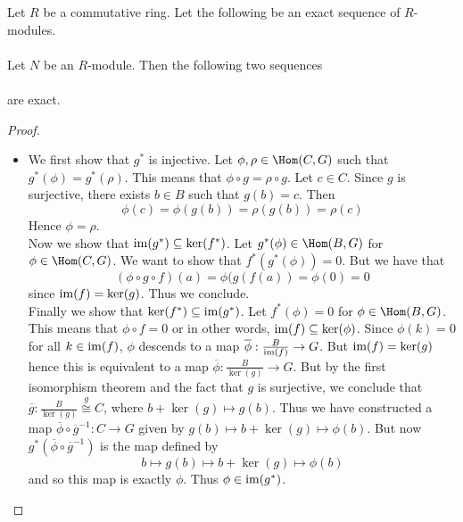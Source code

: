 \documentclass[a4paper]{article}
\begin{document}
\begin{prp}{}{} Let $R$ be a commutative ring. Let the following be an exact sequence of $R$-modules. \\
\\ Let $N$ be an $R$-module. Then the following two sequences \\
 \\ 
are exact. 
\begin{proof}~\\
\begin{itemize}
\item We first show that $g^\ast$ is injective. Let $\phi,\rho\in\Hom(C,G)$ such that $g^\ast(\phi)=g^\ast(\rho)$. This means that $\phi\circ g=\rho\circ g$. Let $c\in C$. Since $g$ is surjective, there exists $b\in B$ such that $g(b)=c$. Then $$\phi(c)=\phi(g(b))=\rho(g(b))=\rho(c)$$ Hence $\phi=\rho$. \\

Now we show that $\operatorname{im}(g^\ast)\subseteq\ker(f^\ast)$. Let $g^\ast(\phi)\in\Hom(B,G)$ for $\phi\in\Hom(C,G)$. We want to show that $f^\ast(g^\ast(\phi))=0$. But we have that $$(\phi\circ g\circ f)(a)=\phi(g(f(a))=\phi(0)=0$$ since $\operatorname{im}(f)=\ker(g)$. Thus we conclude. \\

Finally we show that $\ker(f^\ast)\subseteq\operatorname{im}(g^\ast)$. Let $f^\ast(\phi)=0$ for $\phi\in\Hom(B,G)$. This means that $\phi\circ f=0$ or in other words, $\operatorname{im}(f)\subseteq\ker(\phi)$.
Since $\phi(k)=0$ for all $k\in\operatorname{im}(f)$, $\phi$ descends to a map $\overline{\phi}:\frac{B}{\operatorname{im}(f)}\to G$. But $\operatorname{im}(f)=\ker(g)$ hence this is equivalent to a map $\overline{\phi}:\frac{B}{\ker(g)}\to G$. But by the first isomorphism theorem and the fact that $g$ is surjective, we conclude that $\overline{g}:\frac{B}{\ker(g)}\overset{g}{\cong} C$, where $b+\ker(g)\mapsto g(b)$. Thus we have constructed a map $\overline{\phi}\circ\overline{g}^{-1}:C\to G$ given by $g(b)\mapsto b+\ker(g)\mapsto\phi(b)$. But now $g^\ast(\overline{\phi}\circ\overline{g}^{-1})$ is the map defined by $$b\mapsto g(b)\mapsto b+\ker(g)\mapsto\phi(b)$$ and so this map is exactly $\phi$. Thus $\phi\in\operatorname{im}(g^\ast)$. 
\end{itemize}
\end{proof}
\end{prp}
\end{document}
